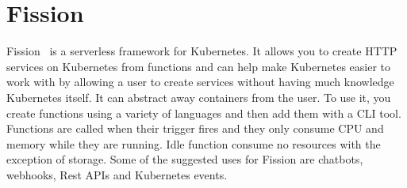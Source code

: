 \section{Fission}
Fission~\cite{hid-sp18-521-FissionBlog} is a serverless framework for
Kubernetes. It allows you to create HTTP services on Kubernetes from
functions and can help make Kubernetes easier to work with by
allowing a user to create services without having much knowledge
Kubernetes itself. It can abstract away containers from the user. 
To use it, you create functions using a variety of languages and then
add them with a CLI tool. Functions are called when their trigger fires and 
they only consume CPU and memory while they are running. Idle function 
consume no resources with the exception of storage. Some of the suggested
uses for Fission are chatbots, webhooks, Rest APIs and Kubernetes events.
